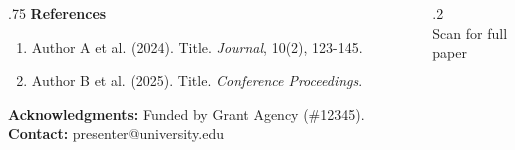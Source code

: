 \documentclass[final,t]{beamer}
\begin{document}
\begin{frame}[t]
\begin{columns}[t]
  \end{columns}

  \vspace{1cm}

  \begin{block}{}
    \footnotesize
    \begin{columns}[T]
      \begin{column}{.75\linewidth}
        \textbf{References}
        \begin{enumerate}
          \item Author A et al. (2024). Title. \textit{Journal}, 10(2), 123-145.
          \item Author B et al. (2025). Title. \textit{Conference Proceedings}.
        \end{enumerate}
        \vspace{0.3cm}
        \textbf{Acknowledgments:} Funded by Grant Agency (\#12345).
        \vspace{0.3cm}
        \textbf{Contact:} presenter@university.edu
      \end{column}
      \begin{column}{.2\linewidth}
        \centering
        \\
        \tiny Scan for full paper
      \end{column}
    \end{columns}
  \end{block}

\end{frame}
\end{document}
